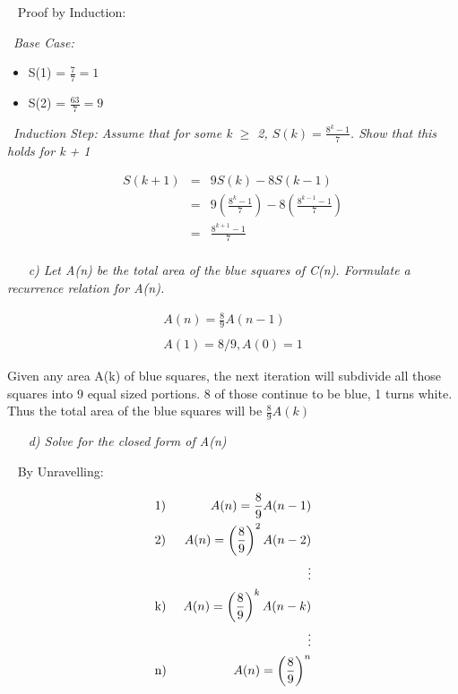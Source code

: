 \documentclass[12pt, letterpaper]{article}
\begin{document}
\-\ \newline
\textnormal{Proof by Induction:}

\-\ \it{Base Case:}
\begin{itemize}
    \item S(1) = \( \frac{7}{7} = 1 \)
    \item S(2) = \( \frac{63}{7} = 9 \)
\end{itemize} 

\-\ \it{Induction Step: \textnormal{Assume that for some k \(\ge\) 2, \(S(k) = \frac{8^k - 1}{7}\). Show that this holds for k + 1}}

\begin{eqnarray*}
    S(k + 1) &=& 9S(k) - 8S(k - 1) \\
    &=& 9 \left( \frac{8^k -1}{7} \right) - 8\left( \frac{8^{k -1} - 1}{7} \right) \\
    &=& \frac{8^{k + 1} - 1}{7} \\
\end{eqnarray*}

\-\ \newline
\-\ \it{ c) Let A(n) be the total area of the blue squares of C(n). Formulate a recurrence relation for A(n). }

\begin{eqnarray*}
    A(n) = \frac{8}{9} A(n - 1) \\
    \\
    A(1) = 8/9, A(0) = 1
\end{eqnarray*}

\textnormal{ Given any area A(k) of blue squares, the next iteration will subdivide all those squares into 9 equal sized portions. 8 of those continue to be blue, 1 turns white. Thus the total area of the blue squares will be \(\frac{8}{9} A(k) \) }

\-\ \newline
\-\ \it{ d) Solve for the closed form of A(n) }

\-\ \newline
\textnormal{ By Unravelling: }

\begin{eqnarray*}
    &\textnormal{1) }& A(n) = \frac{8}{9} A(n - 1) \\
    &\textnormal{2) }& A(n) = \left(\frac{8}{9}\right)^2 A(n - 2) \\
    &\textnormal{  }& \vdots \\
    &\textnormal{k) }& A(n) = \left(\frac{8}{9}\right)^k A(n - k) \\
    &\textnormal{  }& \vdots \\
    &\textnormal{n) }& A(n) = \left(\frac{8}{9}\right)^n \\
\end{eqnarray*}
\end{document}

